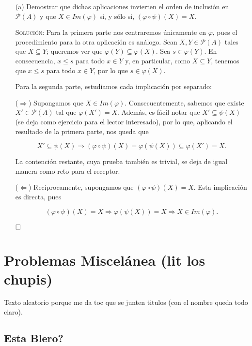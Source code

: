 \documentclass{article}
\begin{document}
\begin{enumerate}
    \item[(a)] Demostrar que dichas aplicaciones invierten el orden de inclusión en $\mathcal{P}(A)$ y que $X \in Im(\varphi)$ si, y sólo si, $(\varphi \circ \psi)(X) = X$.

    \textsc{Solución:} Para la primera parte nos centraremos únicamente en $\varphi$, pues el procedimiento para la otra aplicación es análogo. Sean $X, Y \in \mathcal{P}(A)$ tales que $X \subseteq Y$; queremos ver que $\varphi(Y) \subseteq \varphi(X)$. Sea $s \in \varphi(Y)$. En consecuencia, $x \leq s$ para todo $x \in Y$ y, en particular, como $X \subseteq Y$, tenemos que $x \leq s$ para todo $x \in Y$, por lo que $s \in \varphi(X)$.

    Para la segunda parte, estudiamos cada implicación por separado:

    ($\Longrightarrow$) Supongamos que $X \in Im(\varphi)$. Consecuentemente, sabemos que existe $X' \in \mathcal{P}(A)$ tal que $\varphi(X') = X$. Además, es fácil notar que $X' \subseteq \psi(X)$ (se deja como ejercicio para el lector interesado), por lo que, aplicando el resultado de la primera parte, nos queda que

    \[X' \subseteq \psi(X) \Longrightarrow (\varphi \circ \psi)(X) = \varphi(\psi(X)) \subseteq \varphi(X') = X.\]

    La contención restante, cuya prueba también es trivial, se deja de igual manera como reto para el receptor.

    ($\Longleftarrow$) Recíprocamente, supongamos que $(\varphi \circ \psi)(X) = X$. Esta implicación es directa, pues

    \[(\varphi \circ \psi)(X) = X \Longrightarrow \varphi(\psi(X)) = X \Longrightarrow X \in Im(\varphi).\]

    $\hfill\square$
\end{enumerate}

\newpage

\section{Problemas Miscelánea (lit los chupis)}

Texto aleatorio porque me da toc que se junten titulos (con el nombre queda todo claro).

\subsection{Esta Blero?}
\end{document}
